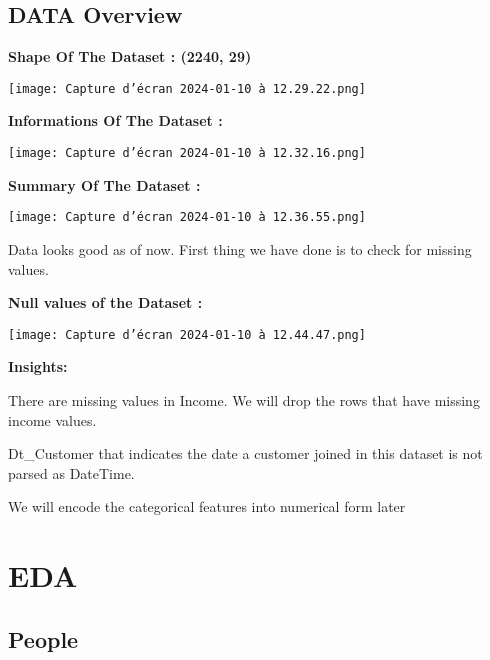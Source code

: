 \documentclass[12pt,a4paper]{report}
\begin{document}
\section{DATA Overview}
\textbf{Shape Of The Dataset : (2240, 29)}

\begin{center}
    \texttt{[image: Capture d’écran 2024-01-10 à 12.29.22.png]}
    \label{fig1}
\end{center}
\newpage

\textbf{Informations Of The Dataset :}

\begin{center}
    \texttt{[image: Capture d’écran 2024-01-10 à 12.32.16.png]}
    \label{fig1}
\end{center}

\newpage
\textbf{Summary Of The Dataset :}

\begin{center}
    \texttt{[image: Capture d’écran 2024-01-10 à 12.36.55.png]}
    \label{fig1}
\end{center}
\newpage
Data looks good as of now. First thing we have done is to check for
missing values.

\textbf{Null values of the Dataset :}

\begin{center}
    \texttt{[image: Capture d’écran 2024-01-10 à 12.44.47.png]}
    \label{fig1}
\end{center}
\textbf{ Insights:}
\vspace{0.2cm}

There are missing values in Income. We will drop the rows that have missing income values.

Dt\_Customer that indicates the date a customer joined in this dataset is not parsed as DateTime.

We will encode the categorical features into numerical form later





\chapter{EDA
}
\section{People}
\end{document}
